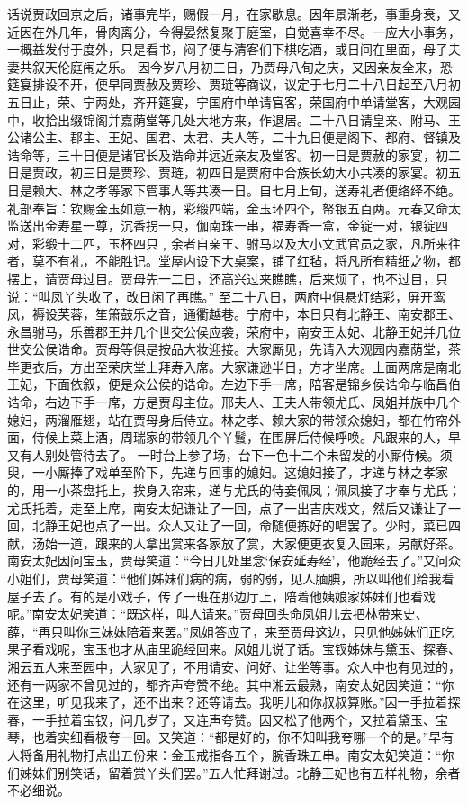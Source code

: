\documentclass[12pt,oneside]{book}
\begin{document}
话说贾政回京之后，诸事完毕，赐假一月，在家歇息。因年景渐老，事重身衰，又近因在外几年，骨肉离分，今得晏然复聚于庭室，自觉喜幸不尽。一应大小事务，一概益发付于度外，只是看书，闷了便与清客们下棋吃酒，或日间在里面，母子夫妻共叙天伦庭闱之乐。
因今岁八月初三日，乃贾母八旬之庆，又因亲友全来，恐筵宴排设不开，便早同贾赦及贾珍、贾琏等商议，议定于七月二十八日起至八月初五日止，荣、宁两处，齐开筵宴，宁国府中单请官客，荣国府中单请堂客，大观园中，收拾出缀锦阁并嘉荫堂等几处大地方来，作退居。二十八日请皇亲、附马、王公诸公主、郡主、王妃、国君、太君、夫人等，二十九日便是阁下、都府、督镇及诰命等，三十日便是诸官长及诰命并远近亲友及堂客。初一日是贾赦的家宴，初二日是贾政，初三日是贾珍、贾琏，初四日是贾府中合族长幼大小共凑的家宴。初五日是赖大、林之孝等家下管事人等共凑一日。自七月上旬，送寿礼者便络绎不绝。礼部奉旨：钦赐金玉如意一柄，彩缎四端，金玉环四个，帑银五百两。元春又命太监送出金寿星一尊，沉香拐一只，伽南珠一串，福寿香一盒，金锭一对，银锭四对，彩缎十二匹，玉杯四只﹐余者自亲王、驸马以及大小文武官员之家，凡所来往者，莫不有礼，不能胜记。堂屋内设下大桌案，铺了红毡，将凡所有精细之物，都摆上，请贾母过目。贾母先一二日，还高兴过来瞧瞧，后来烦了，也不过目，只说：“叫凤丫头收了，改日闲了再瞧。”
至二十八日，两府中俱悬灯结彩，屏开鸾凤，褥设芙蓉，笙箫鼓乐之音，通衢越巷。宁府中，本日只有北静王、南安郡王、永昌驸马，乐善郡王并几个世交公侯应袭，荣府中，南安王太妃、北静王妃并几位世交公侯诰命。贾母等俱是按品大妆迎接。大家厮见，先请入大观园内嘉荫堂，茶毕更衣后，方出至荣庆堂上拜寿入席。大家谦逊半日，方才坐席。上面两席是南北王妃，下面依叙，便是众公侯的诰命。左边下手一席，陪客是锦乡侯诰命与临昌伯诰命，右边下手一席，方是贾母主位。邢夫人、王夫人带领尤氏、凤姐并族中几个媳妇，两溜雁翅，站在贾母身后侍立。林之孝、赖大家的带领众媳妇，都在竹帘外面，侍候上菜上酒，周瑞家的带领几个丫鬟，在围屏后侍候呼唤。凡跟来的人，早又有人别处管待去了。
一时台上参了场，台下一色十二个未留发的小厮侍候。须臾，一小厮捧了戏单至阶下，先递与回事的媳妇。这媳妇接了，才递与林之孝家的，用一小茶盘托上，挨身入帘来，递与尤氏的侍妾佩凤；佩凤接了才奉与尤氏；尤氏托着，走至上席，南安太妃谦让了一回，点了一出吉庆戏文，然后又谦让了一回，北静王妃也点了一出。众人又让了一回，命随便拣好的唱罢了。少时，菜已四献，汤始一道，跟来的人拿出赏来各家放了赏，大家便更衣复入园来，另献好茶。
南安太妃因问宝玉，贾母笑道：“今日几处里念‘保安延寿经’，他跪经去了。”又问众小姐们，贾母笑道：“他们姊妹们病的病，弱的弱，见人腼腆，所以叫他们给我看屋子去了。有的是小戏子，传了一班在那边厅上，陪着他姨娘家姊妹们也看戏呢。”南安太妃笑道：“既这样，叫人请来。”贾母回头命凤姐儿去把林带来史、薛，“再只叫你三妹妹陪着来罢。”凤姐答应了，来至贾母这边，只见他姊妹们正吃果子看戏呢，宝玉也才从庙里跪经回来。凤姐儿说了话。宝钗姊妹与黛玉、探春、湘云五人来至园中，大家见了，不用请安、问好、让坐等事。众人中也有见过的，还有一两家不曾见过的，都齐声夸赞不绝。其中湘云最熟，南安太妃因笑道：“你在这里，听见我来了，还不出来？还等请去。我明儿和你叔叔算账。”因一手拉着探春，一手拉着宝钗，问几岁了，又连声夸赞。因又松了他两个，又拉着黛玉、宝琴，也着实细看极夸一回。又笑道：“都是好的，你不知叫我夸哪一个的是。”早有人将备用礼物打点出五份来：金玉戒指各五个，腕香珠五串。南安太妃笑道：“你们姊妹们别笑话，留着赏丫头们罢。”五人忙拜谢过。北静王妃也有五样礼物，余者不必细说。
\end{document}
